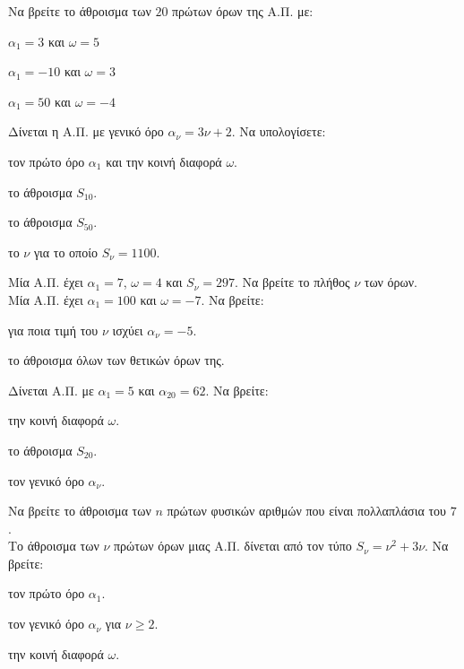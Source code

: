 \documentclass[11pt,a4paper,modern]{FFExercises}
\begin{document}
\askhsh Να βρείτε το άθροισμα των $20$ πρώτων όρων της Α.Π. με:
\begin{alist}
\item $\alpha_1=3$ και $\omega=5$
\item $\alpha_1=-10$ και $\omega=3$
\item $\alpha_1=50$ και $\omega=-4$
\end{alist}

\askhsh Δίνεται η Α.Π. με γενικό όρο $\alpha_{\nu}=3\nu+2$. Να υπολογίσετε:
\begin{alist}
\item τον πρώτο όρο $\alpha_1$ και την κοινή διαφορά $\omega$.
\item το άθροισμα $S_{10}$.
\item το άθροισμα $S_{50}$.
\item το $\nu$ για το οποίο $S_{\nu}=1100$.
\end{alist}

\askhsh Μία Α.Π. έχει $\alpha_1=7$, $\omega=4$ και $S_{\nu}=297$. Να βρείτε το πλήθος $\nu$ των όρων.\\

\askhsh Μία Α.Π. έχει $\alpha_1=100$ και $\omega=-7$. Να βρείτε:
\begin{alist}
\item για ποια τιμή του $\nu$ ισχύει $\alpha_{\nu}=-5$.
\item το άθροισμα όλων των θετικών όρων της.
\end{alist}

\askhsh Δίνεται Α.Π. με $\alpha_1=5$ και $\alpha_{20}=62$. Να βρείτε:
\begin{alist}
\item την κοινή διαφορά $\omega$.
\item το άθροισμα $S_{20}$.
\item τον γενικό όρο $\alpha_{\nu}$.
\end{alist}

\askhsh Να βρείτε το άθροισμα των $n$ πρώτων φυσικών αριθμών που είναι πολλαπλάσια του $7$.\\

\askhsh Το άθροισμα των $\nu$ πρώτων όρων μιας Α.Π. δίνεται από τον τύπο $S_{\nu}=\nu^2+3\nu$. Να βρείτε:
\begin{alist}
\item τον πρώτο όρο $\alpha_1$.
\item τον γενικό όρο $\alpha_{\nu}$ για $\nu\geq 2$.
\item την κοινή διαφορά $\omega$.
\end{alist}
\end{document}
